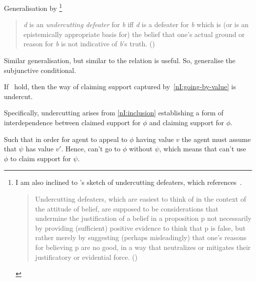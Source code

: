 \begin{note}
  Generalisation by \citeauthor{Bergmann:2005ws}\nolinebreak
  \footnote{
    I am also inclined to \citeauthor{Worsnip:2018aa}'s sketch of undercutting defeaters, which references~\citeauthor{Bergmann:2005ws}.
    \begin{quote}
      Undercutting defeaters, which are easiest to think of in the context of the attitude of belief, are supposed to be considerations that undermine the justification of a belief in a proposition p not necessarily by providing (sufficient) positive evidence to think that p is false, but rather merely by suggesting (perhaps misleadingly) that one’s reasons for believing p are no good, in a way that neutralizes or mitigates their justificatory or evidential force.\linebreak
      \mbox{}\hfill\mbox{(\Citeyear[29]{Worsnip:2018aa})}
    \end{quote}
  }
  \begin{quote}
    \emph{d} is an \emph{undercutting defeater} for \emph{b} iff \emph{d} is a defeater for \emph{b} which is (or is an epistemically appropriate basis for) the belief that one's actual ground or reason for \emph{b} is not indicative of \emph{b}'s truth.\linebreak
    \mbox{}\hfill\mbox{(\cite[424]{Bergmann:2005ws})}
  \end{quote}

  Similar generalisation, but similar to \citeauthor{Pollock:1974uk} the relation is useful.
  So, generalise the subjunctive conditional.

  {\color{green}
  If~\nIBackground{} hold, then the way of claiming support captured by~\ref{nI:going-by-value} is undercut.

    Specifically, undercutting arises from \ref{nI:inclusion} establishing a form of interdependence between claimed support for \(\phi\) and claiming support for \(\phi\).

  Such that in order for agent to appeal to \(\phi\) having value \(v\) the agent must assume that \(\psi\) has value \(v'\).
  Hence, can't go to \(\phi\) without \(\psi\), which means that can't use \(\phi\) to claim support for \(\psi\).
  }
\end{note}

